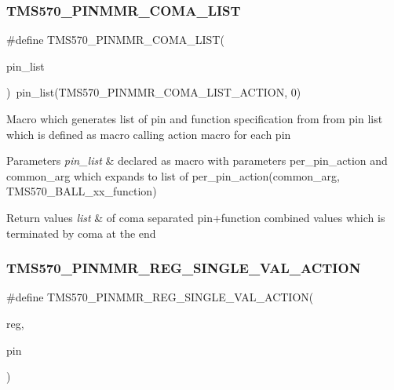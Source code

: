 \subsubsection{\texorpdfstring{TMS570\_PINMMR\_COMA\_LIST}{TMS570\_PINMMR\_COMA\_LIST}}
{\footnotesize\ttfamily \#define T\+M\+S570\+\_\+\+P\+I\+N\+M\+M\+R\+\_\+\+C\+O\+M\+A\+\_\+\+L\+I\+ST(\begin{DoxyParamCaption}\item[{}]{pin\+\_\+list }\end{DoxyParamCaption})~pin\+\_\+list(T\+M\+S570\+\_\+\+P\+I\+N\+M\+M\+R\+\_\+\+C\+O\+M\+A\+\_\+\+L\+I\+S\+T\+\_\+\+A\+C\+T\+I\+ON, 0)}

Macro which generates list of pin and function specification from from pin list which is defined as macro calling action macro for each pin


\begin{DoxyParams}{Parameters}
{\em pin\+\_\+list} & declared as macro with parameters {\ttfamily per\+\_\+pin\+\_\+action} and {\ttfamily common\+\_\+arg} which expands to list of {\ttfamily per\+\_\+pin\+\_\+action}({\ttfamily common\+\_\+arg}, {\ttfamily T\+M\+S570\+\_\+\+B\+A\+L\+L\+\_\+xx\+\_\+function})\\
\hline
\end{DoxyParams}

\begin{DoxyRetVals}{Return values}
{\em list} & of coma separated pin+function combined values which is terminated by coma at the end \\
\hline
\end{DoxyRetVals}
\mbox{\label{tms570-pinmux_8h_a3d2df778ede09ae2ad095485b8206eb4}} 
\subsubsection{\texorpdfstring{TMS570\_PINMMR\_REG\_SINGLE\_VAL\_ACTION}{TMS570\_PINMMR\_REG\_SINGLE\_VAL\_ACTION}}
{\footnotesize\ttfamily \#define T\+M\+S570\+\_\+\+P\+I\+N\+M\+M\+R\+\_\+\+R\+E\+G\+\_\+\+S\+I\+N\+G\+L\+E\+\_\+\+V\+A\+L\+\_\+\+A\+C\+T\+I\+ON(\begin{DoxyParamCaption}\item[{}]{reg,  }\item[{}]{pin }\end{DoxyParamCaption})}

